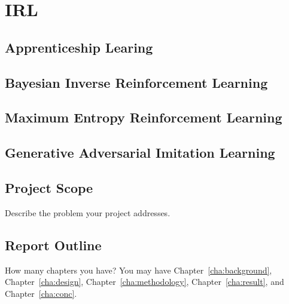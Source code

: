 \chapter{IRL}
\label{cha:Ref2}

\section{Apprenticeship Learing}

\section{Bayesian Inverse Reinforcement Learning}

\section{Maximum Entropy Reinforcement Learning}

\section{Generative Adversarial Imitation Learning}
\label{sec:motivations}


\section{Project Scope}
\label{sec:projectscope}
Describe the problem your project addresses.


\section{Report Outline}
\label{sec:outline}

How many chapters you have? You may have Chapter~\ref{cha:background},
Chapter~\ref{cha:design}, Chapter~\ref{cha:methodology},
Chapter~\ref{cha:result}, and Chapter~\ref{cha:conc}.
